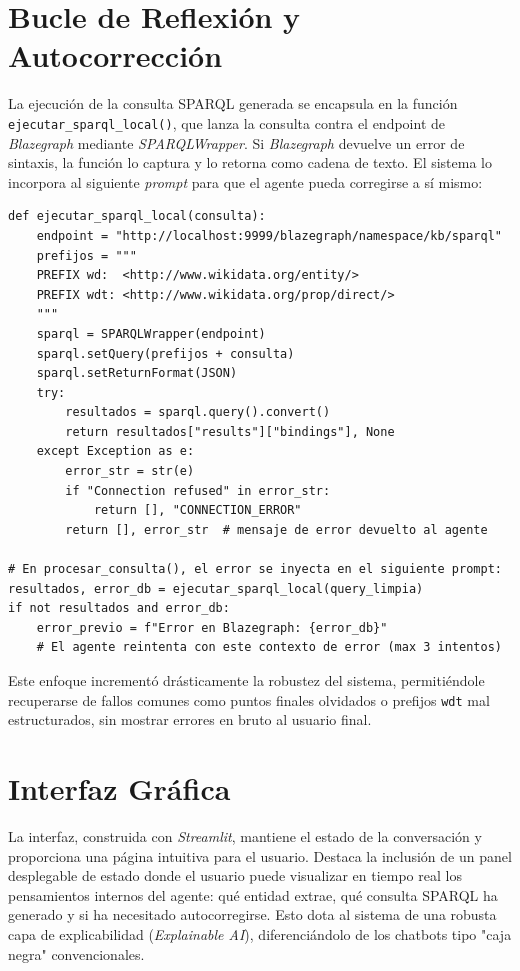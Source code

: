 \section{Bucle de Reflexión y Autocorrección}

La ejecución de la consulta SPARQL generada se encapsula en la función \texttt{ejecutar\_sparql\_local()}, que lanza la consulta contra el endpoint de \textit{Blazegraph} mediante \textit{SPARQLWrapper}. Si \textit{Blazegraph} devuelve un error de sintaxis, la función lo captura y lo retorna como cadena de texto. El sistema lo incorpora al siguiente \textit{prompt} para que el agente pueda corregirse a sí mismo:

\begin{lstlisting}[style=Python-color, caption={Bucle de reflexión ante errores de Blazegraph}, label=lst:reflexion]
def ejecutar_sparql_local(consulta):
    endpoint = "http://localhost:9999/blazegraph/namespace/kb/sparql"
    prefijos = """
    PREFIX wd:  <http://www.wikidata.org/entity/>
    PREFIX wdt: <http://www.wikidata.org/prop/direct/>
    """
    sparql = SPARQLWrapper(endpoint)
    sparql.setQuery(prefijos + consulta)
    sparql.setReturnFormat(JSON)
    try:
        resultados = sparql.query().convert()
        return resultados["results"]["bindings"], None
    except Exception as e:
        error_str = str(e)
        if "Connection refused" in error_str:
            return [], "CONNECTION_ERROR"
        return [], error_str  # mensaje de error devuelto al agente

# En procesar_consulta(), el error se inyecta en el siguiente prompt:
resultados, error_db = ejecutar_sparql_local(query_limpia)
if not resultados and error_db:
    error_previo = f"Error en Blazegraph: {error_db}"
    # El agente reintenta con este contexto de error (max 3 intentos)
\end{lstlisting}

Este enfoque incrementó drásticamente la robustez del sistema, permitiéndole recuperarse de fallos comunes como puntos finales olvidados o prefijos \texttt{wdt} mal estructurados, sin mostrar errores en bruto al usuario final.

\section{Interfaz Gráfica}

La interfaz, construida con \textit{Streamlit}, mantiene el estado de la conversación y proporciona una página intuitiva para el usuario. Destaca la inclusión de un panel desplegable de estado donde el usuario puede visualizar en tiempo real los pensamientos internos del agente: qué entidad extrae, qué consulta SPARQL ha generado y si ha necesitado autocorregirse. Esto dota al sistema de una robusta capa de explicabilidad (\textit{Explainable AI}), diferenciándolo de los chatbots tipo "caja negra" convencionales.
